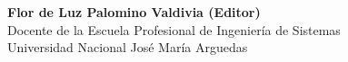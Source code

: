 \begin{center}
\textbf{Flor de Luz Palomino Valdivia (Editor)}\\
Docente de la Escuela Profesional de Ingeniería de Sistemas \\
Universidad Nacional José María Arguedas \\
\end{center}

